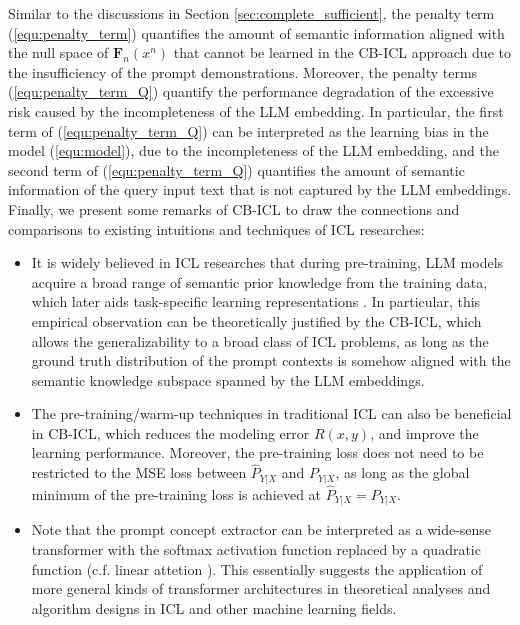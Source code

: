 \documentclass{article} %
\theoremstyle{plain} %
\begin{document}
Similar to the discussions in Section \ref{sec:complete_sufficient}, the penalty term (\ref{equ:penalty_term}) quantifies the amount of semantic information aligned with the null space of $\mathbf{F}_n(x^n)$ that cannot be learned in the CB-ICL approach due to the insufficiency of the prompt demonstrations. 
Moreover, the penalty terms (\ref{equ:penalty_term_Q}) quantify the performance degradation of the excessive risk caused by the incompleteness of the LLM embedding. In particular, the first term of (\ref{equ:penalty_term_Q}) can be interpreted as the learning bias in the model (\ref{equ:model}), due to the incompleteness of the LLM embedding, and the second term of (\ref{equ:penalty_term_Q}) quantifies the amount of semantic information of the query input text that is not captured by the LLM embeddings. 
Finally, we present some remarks of CB-ICL to draw the connections and comparisons to existing intuitions and techniques of ICL researches:

\begin{itemize}
    \item It is widely believed in ICL researches that during pre-training, LLM models acquire a broad range of semantic prior knowledge from the training data, which later aids task-specific learning representations \citep{chan2022data,shin2022effect,yadlowsky2023pretraining,yang2024context}. In particular, this empirical observation can be theoretically justified by the CB-ICL, which allows the generalizability to a broad class of ICL problems, as long as the ground truth distribution of the prompt contexts is somehow aligned with the semantic knowledge subspace spanned by the LLM embeddings.
    \item The pre-training/warm-up techniques \citep{brunet2023icl,shi2023context,li2024mend} in traditional ICL can also be beneficial in CB-ICL, which reduces the modeling error $R(x,y)$, and improve the learning performance. Moreover, the pre-training loss does not need to be restricted to the MSE loss between $\hat{P}_{Y|X}$ and $P_{Y|X}$, as long as the global minimum of the pre-training loss is achieved at $\hat{P}_{Y|X} = P_{Y|X}$.
    \item Note that the prompt concept extractor can be interpreted as a wide-sense transformer with the softmax activation function replaced by a quadratic function (c.f. linear attetion \citep{wang2020linformer,shen2021efficient,han2024demystify}). This essentially suggests the application of more general kinds of transformer architectures in theoretical analyses and algorithm designs in ICL and other machine learning fields.
\end{itemize}
\end{document}
